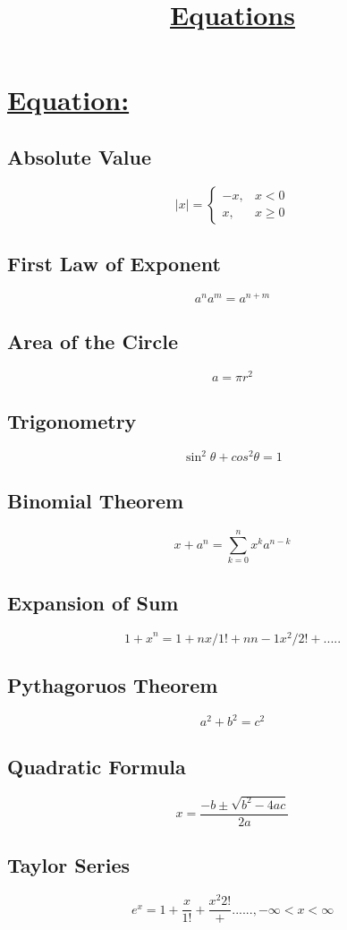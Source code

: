 \documentclass{article}
\title{\textbf{\underline{Equations}}}
\date{}
\begin{document}
\maketitle
\section{\underline{Equation:}}
\subsection{Absolute Value}
$$
|x|=\left\lbrace
\begin{array}{ll}
-x,&x<0\\
x,&x\geq0

\end{array}
\right.
$$
\subsection{First Law of Exponent}
$$
a^{n}a^{m}=a^{n+m}
$$
\subsection{Area of the Circle}
$$
a=\pi r^{2}
$$
\subsection{Trigonometry}
$$
\sin^{2}\theta+cos^{2}\theta=1
$$
\subsection{Binomial Theorem}
$$
{x+a}^n=\sum_{k=0}^{n}x^{k}a^{n-k}
$$
\subsection{Expansion of Sum}
$$
{1+x}^n=1+nx/1!+n{n-1}x^2/2!+.....
$$
\subsection{Pythagoruos Theorem}
$$
a^{2}+b^{2}=c^{2}
$$
\subsection{Quadratic Formula}
$$
x=\frac{-b\pm\sqrt{b^{2}-4ac}}{2a}
$$
\subsection{Taylor Series}
$$
e^{x}=1+\frac{x}{1!}+\frac{x^{2}{2!}}+......,-\infty<x<\infty
$$
\end{document}
